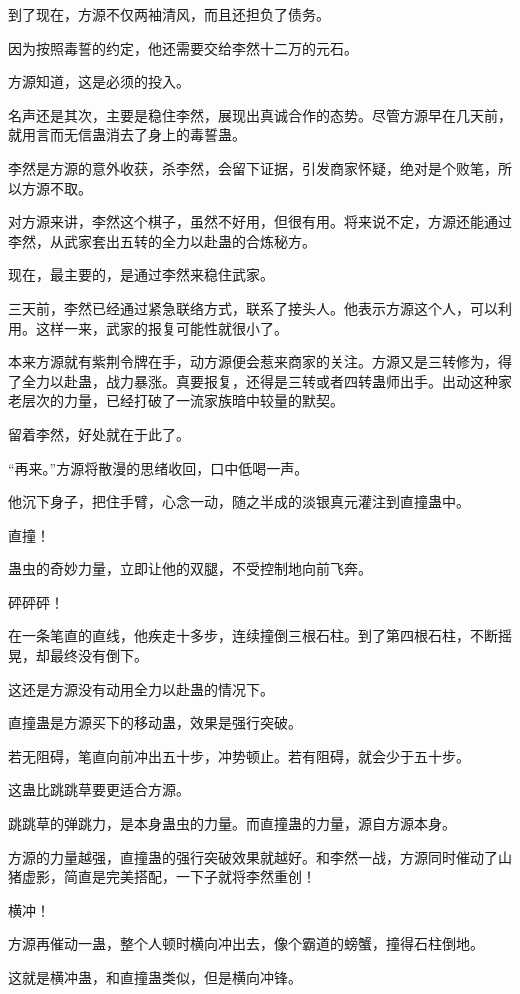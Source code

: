\begin{this_body}
到了现在，方源不仅两袖清风，而且还担负了债务。

因为按照毒誓的约定，他还需要交给李然十二万的元石。

方源知道，这是必须的投入。

名声还是其次，主要是稳住李然，展现出真诚合作的态势。尽管方源早在几天前，就用言而无信蛊消去了身上的毒誓蛊。

李然是方源的意外收获，杀李然，会留下证据，引发商家怀疑，绝对是个败笔，所以方源不取。

对方源来讲，李然这个棋子，虽然不好用，但很有用。将来说不定，方源还能通过李然，从武家套出五转的全力以赴蛊的合炼秘方。

现在，最主要的，是通过李然来稳住武家。

三天前，李然已经通过紧急联络方式，联系了接头人。他表示方源这个人，可以利用。这样一来，武家的报复可能性就很小了。

本来方源就有紫荆令牌在手，动方源便会惹来商家的关注。方源又是三转修为，得了全力以赴蛊，战力暴涨。真要报复，还得是三转或者四转蛊师出手。出动这种家老层次的力量，已经打破了一流家族暗中较量的默契。

留着李然，好处就在于此了。

“再来。”方源将散漫的思绪收回，口中低喝一声。

他沉下身子，把住手臂，心念一动，随之半成的淡银真元灌注到直撞蛊中。

直撞！

蛊虫的奇妙力量，立即让他的双腿，不受控制地向前飞奔。

砰砰砰！

在一条笔直的直线，他疾走十多步，连续撞倒三根石柱。到了第四根石柱，不断摇晃，却最终没有倒下。

这还是方源没有动用全力以赴蛊的情况下。

直撞蛊是方源买下的移动蛊，效果是强行突破。

若无阻碍，笔直向前冲出五十步，冲势顿止。若有阻碍，就会少于五十步。

这蛊比跳跳草要更适合方源。

跳跳草的弹跳力，是本身蛊虫的力量。而直撞蛊的力量，源自方源本身。

方源的力量越强，直撞蛊的强行突破效果就越好。和李然一战，方源同时催动了山猪虚影，简直是完美搭配，一下子就将李然重创！

横冲！

方源再催动一蛊，整个人顿时横向冲出去，像个霸道的螃蟹，撞得石柱倒地。

这就是横冲蛊，和直撞蛊类似，但是横向冲锋。


\end{this_body}
